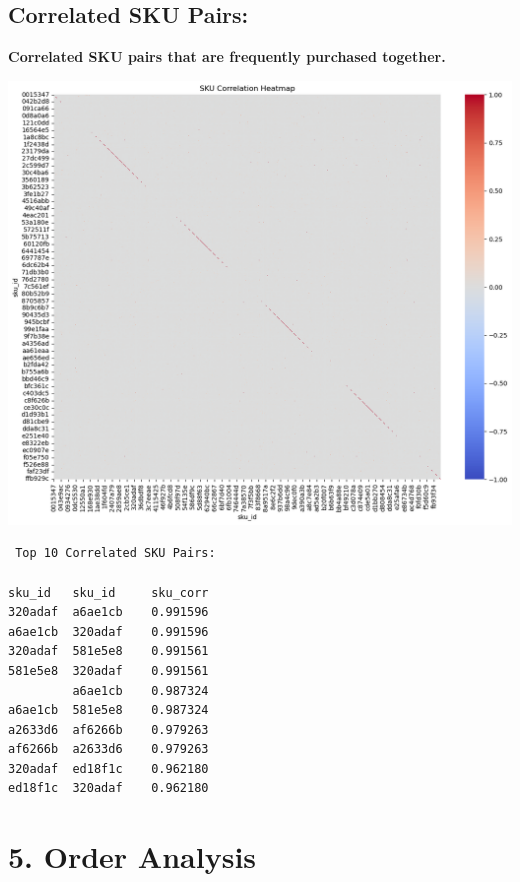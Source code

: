\documentclass{article}
\begin{document}
    \subsection{Correlated SKU Pairs:}
    \textbf{Correlated SKU pairs that are frequently purchased together.}
    \begin{center}
        \includegraphics[width=1\columnwidth]{images/corr-sku.png}
    \end{center}
    \begin{verbatim}
 Top 10 Correlated SKU Pairs:

sku_id   sku_id     sku_corr
320adaf  a6ae1cb    0.991596      
a6ae1cb  320adaf    0.991596
320adaf  581e5e8    0.991561
581e5e8  320adaf    0.991561
         a6ae1cb    0.987324
a6ae1cb  581e5e8    0.987324
a2633d6  af6266b    0.979263
af6266b  a2633d6    0.979263
320adaf  ed18f1c    0.962180
ed18f1c  320adaf    0.962180
    \end{verbatim}


\section{5. Order Analysis}
\end{document}
